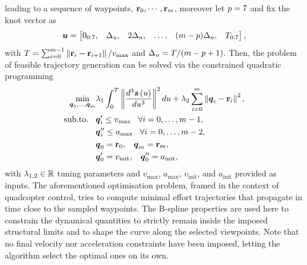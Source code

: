 leading to a sequence of waypoints, $\mathbf{r}_0, \cdots, \mathbf{r}_{m}$, moreover let $p = 7$ and fix the knot vector as
\begin{equation*}
	\boldsymbol{u} =
	\begin{bmatrix}
		0_{0:7}, & \Delta_{u}, & 2\Delta_{u}, & \dots, & (m-p)\Delta_{u}, & T_{0:7}
	\end{bmatrix},
\end{equation*}
with $T = \sum_{i=0}^{m-1} \left \lVert {\mathbf{r}_i - \mathbf{r}_{i+1}} \right \rVert/v_{\text{max}}$ and $\Delta_{u} = T/(m - p + 1)$.
Then, the problem of feasible trajectory generation can be solved via the constrained quadratic programming
\begin{equation}%
	\label{EQ:SEARCH-OPTIMISATION-PROBLEM}
	\begin{split}
	\min_{\bs{\cpoint}_{0}, \dots, \bs{\cpoint}_{\cpnumber}} &
				\lambda_1 \int_0^{T} \norm{\frac{d^3 \bs{\spline} \lp \splinevar \rp}{d \splinevar^3}}^2 d \splinevar
				+ \lambda_2 \sum_{i=0}^{\cpnumber} \norm{\bs{\cpoint}_i - \rr_i}^2, \\
	\text{sub.to.} \hspace{0.3cm} &
				\bs{\cpoint}_i' \le v_{\text{max}} \hspace{0.3cm} \forall i = 0, \dots, \cpnumber-1, \\
				& \bs{\cpoint}_i'' \le a_{\text{max}} \hspace{0.3cm} \forall i = 0, \dots, \cpnumber-2, \\
				& \bs{\cpoint}_0 = \rr_0, \hspace{0.3cm} \bs{\cpoint}_{\cpnumber} = \rr_{\cpnumber}, \\
				& \bs{\cpoint}_0' = v_{\text{init}}, \hspace{0.3cm} \bs{\cpoint}_0'' = a_{\text{init}},
	\end{split}
\end{equation}
with $\lambda_{1,2} \in \mathbb{R}$ tuning parameters and $v_{\text{max}}$, $a_{\text{max}}$, $v_{\text{init}}$, and $a_{\text{init}}$ provided as
inputs. The aforementioned optimisation problem, framed in the context of quadcopter control, tries to compute minimal effort trajectories that
propagate in time close to the sampled waypoints. The B-spline properties are used here to constrain the dynamical quantities to strictly
remain inside the imposed structural limits and to shape the curve along the selected viewpoints.
Note that no final velocity nor acceleration constraints have been imposed, letting the algorithm select the optimal ones on its own.
